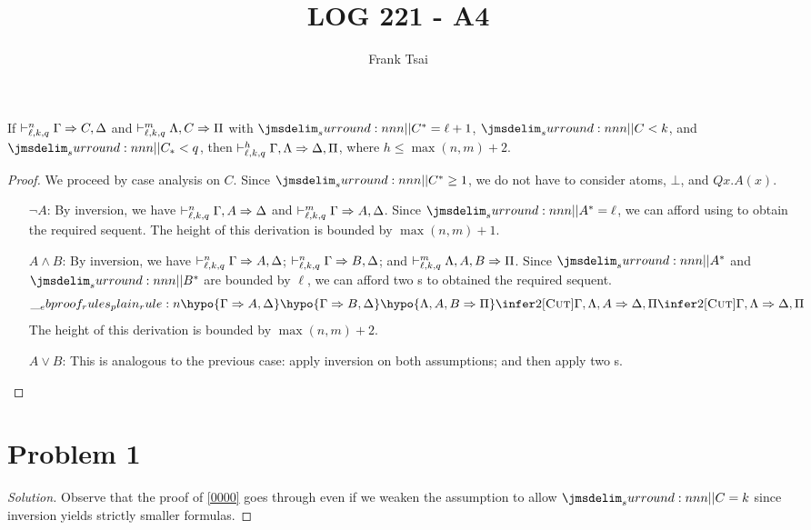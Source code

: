 \documentclass[a4paper]{article}
\title{LOG 221 - A4}
\author{Frank Tsai}
\begin{document}
\maketitle

\begin{lemma}\label{0000}
  If $\mathrel{\vdash^{n}_{\ell,k,q}} \Gamma \Rightarrow C,\Delta$ and $\mathrel{\vdash^{m}_{\ell,k,q}} \Lambda,C \Rightarrow \Pi$ with $\dRank{C} = \ell + 1$, $\cRank{C} < k$, and $\qRank{C} < q$, then $\mathrel{\vdash^{h}_{\ell,k,q}} \Gamma,\Lambda \Rightarrow \Delta,\Pi$, where $h \leq \max(n,m) + 2$.
\end{lemma}
\begin{proof}
  We proceed by case analysis on $C$.
  Since $\dRank{C} \geq 1$, we do not have to consider atoms, $\bot$, and $Qx.A(x)$.
  \begin{itemize}
  \item[$\lnot A$:] By inversion, we have $\mathrel{\vdash^{n}_{\ell,k,q}} \Gamma,A \Rightarrow \Delta$ and $\mathrel{\vdash^{m}_{\ell,k,q}} \Gamma \Rightarrow A, \Delta$.
    Since $\dRank{A} = \ell$, we can afford using \rCut{} to obtain the required sequent.
    The height of this derivation is bounded by $\max(n,m) + 1$.
  \item[$A \wedge B$:] By inversion, we have $\mathrel{\vdash^{n}_{\ell,k,q}} \Gamma \Rightarrow A,\Delta$; $\mathrel{\vdash^{n}_{\ell,k,q}} \Gamma \Rightarrow B,\Delta$; and $\mathrel{\vdash^{m}_{\ell,k,q}} \Lambda,A,B \Rightarrow \Pi$.
    Since $\dRank{A}$ and $\dRank{B}$ are bounded by $\ell$, we can afford two \rCut{}s to obtained the required sequent.
    \[
      \ebrule{
        \hypo{\Gamma \Rightarrow A,\Delta}
        \hypo{\Gamma \Rightarrow B,\Delta}
        \hypo{\Lambda,A,B \Rightarrow \Pi}
        \infer2[\rCut]{\Gamma,\Lambda,A \Rightarrow \Delta,\Pi}
        \infer2[\rCut]{\Gamma,\Lambda \Rightarrow \Delta,\Pi}
      }
    \]
    The height of this derivation is bounded by $\max(n,m) + 2$.
  \item[$A \vee B$:] This is analogous to the previous case: apply inversion on both assumptions; and then apply two \rCut{}s.
  \end{itemize}
\end{proof}

\section*{Problem 1}\label{0001}
\begin{proof}[Solution]
  Observe that the proof of \cref{0000} goes through even if we weaken the assumption to allow $\cRank{C} = k$ since inversion yields strictly smaller formulas.
\end{proof}
\end{document}
